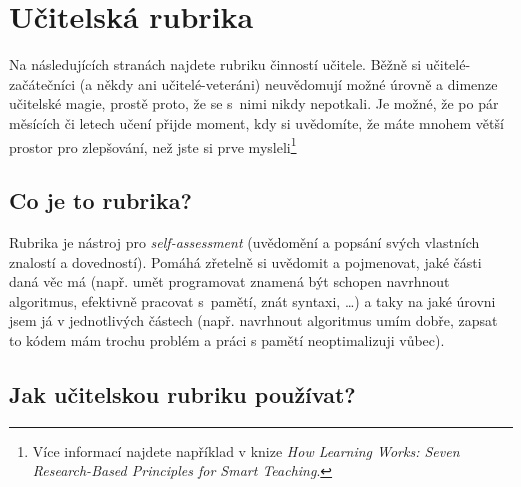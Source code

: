
\newcommand{\rubriccriterion}[4]{
\stepcounter{rubricquestion}
\section*{\therubricquestion: #1}

\smallskip
\note{Neznalý:} #2

\note{Začátečník:} #3

\note{Guru:} #4

\medskip
\begin{tikzpicture}
\draw (0,0) -- (8,0);
\foreach \i in {0,1,...,8} %
{
\fill[black] (\i,0) circle (1.5 mm);
\fill[white] (\i,0) circle (1.4 mm);
}
\node at (0.15, -0.5) {neznalý};
\node at (3, -0.5)    {začátečník};
\node at (8, -0.5)    {guru};
\end{tikzpicture}
}

\restoregeometry
\chapter*{Učitelská rubrika}
\label{rubrika}

Na následujících stranách najdete rubriku činností učitele. Běžně si učitelé-začátečníci (a někdy ani učitelé-veteráni) neuvědomují možné úrovně a dimenze učitelské magie, prostě proto, že se s~nimi nikdy nepotkali. Je možné, že po pár měsících či letech učení přijde moment, kdy si uvědomíte, že máte mnohem větší prostor pro zlepšování, než jste si prve mysleli\footnote{Více informací najdete například v knize \emph{How Learning Works: Seven Research-Based Principles for Smart Teaching}.}

\section*{Co je to rubrika?}

Rubrika je nástroj pro \emph{self-assessment} (uvědomění a popsání svých vlastních znalostí a dovedností).
Pomáhá zřetelně si uvědomit a pojmenovat, jaké části daná věc má (např. umět programovat znamená být schopen navrhnout algoritmus, efektivně pracovat s~pamětí, znát syntaxi, \dots) a taky na jaké úrovni jsem já v jednotlivých částech (např. navrhnout algoritmus umím dobře, zapsat to kódem mám trochu problém a práci s pamětí neoptimalizuji vůbec).

\section*{Jak učitelskou rubriku používat?}


